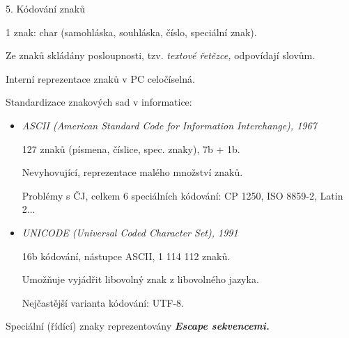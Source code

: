\documentclass[czech]{beamer}
\begin{document}
\begin{frame}{5. Kódování znaků}

{\tiny 1 znak: char (samohláska, souhláska, číslo, speciální znak).}{\tiny\par}

{\tiny Ze znaků skládány posloupnosti, tzv. }{\tiny\emph{textové řetězce,
}}{\tiny odpovídají slovům}{\tiny\emph{.}}{\tiny\par}

{\tiny Interní reprezentace znaků v PC celočíselná.}{\tiny\par}

{\tiny\medskip{}
}{\tiny\par}

{\tiny Standardizace znakových sad v informatice:}{\tiny\par}
\begin{itemize}
\item {\tiny\emph{ASCII (American Standard Code for Information Interchange),
1967}}{\tiny\par}

{\tiny 127 znaků (písmena, číslice, spec. znaky), 7b + 1b.}{\tiny\par}

{\tiny Nevyhovující, reprezentace malého množství znaků.}{\tiny\par}

{\tiny Problémy s ČJ, celkem 6 speciálních kódování: CP 1250, ISO 8859-2,
Latin 2...}{\tiny\par}
\item {\tiny\emph{UNICODE (Universal Coded Character Set), 1991}}{\tiny\par}

{\tiny 16b kódování, nástupce ASCII, 1 114 112 znaků.}{\tiny\par}

{\tiny Umožňuje vyjádřit libovolný znak z libovolného jazyka.}{\tiny\par}

{\tiny Nejčastější varianta kódování: UTF-8.}{\tiny\par}
\end{itemize}
{\tiny Speciální (řídící) znaky reprezentovány }{\tiny\textbf{\emph{Escape
sekvencemi.}}}{\tiny\par}


\end{frame}
\end{document}
